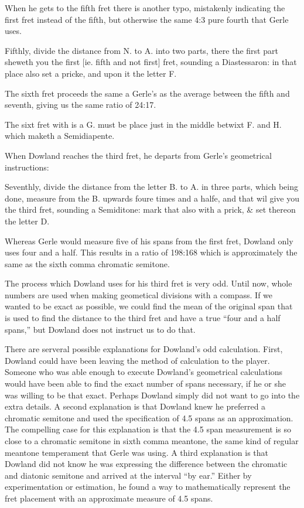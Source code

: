 When he gets to the fifth fret there is another typo, mistakenly indicating the
first fret instead of the fifth, but otherwise the same 4:3 pure fourth that
Gerle uses.
\begin{blocks}
Fifthly, divide the distance from N. to A. into two parts, there the first part
sheweth you the first [ie. fifth and not first] fret, sounding a Diastessaron:
in that place also set a pricke, and upon it the letter F.
\end{blocks}
The sixth fret proceeds the same a Gerle's as the average between the fifth and
seventh, giving us the same ratio of 24:17.
\begin{blocks}
The sixt fret with is a G. must be place just in the middle betwixt F. and H.
which maketh a Semidiapente.
\end{blocks}

When Dowland reaches the third fret, he departs from Gerle's
geometrical instructions:
\begin{blocks}
Seventhly, divide the distance from the letter B. to A. in three parts, which
being done, measure from the B. upwards foure times and a halfe, and that wil
give you the third fret, sounding a Semiditone: mark that also with a prick,
\& set thereon the letter D.
\end{blocks}
Whereas Gerle would measure five of his spans from the first fret, Dowland only
uses four and a half. This results in a ratio of 198:168 which is approximately
the same as the sixth comma chromatic semitone.



The process which Dowland uses for his third fret is very odd.
Until now, whole numbers are used when making geometical divisions with a compass.
If we wanted to be exact as possible, we could find the
mean of the original span that is used to find the distance to the
third fret and have a true “four and a half spans,” but Dowland does not instruct
us to do that.

There are serveral possible explanations for Dowland's odd calculation.  First, Dowland could have
been leaving the
method of calculation to the player.  Someone who was able enough
to execute Dowland's geometrical calculations would have been able to find
the exact number of spans necessary, if he or she was willing to be that exact.  Perhaps
Dowland simply did not want to go into the extra details.
A second explanation is that Dowland knew he preferred a chromatic semitone and used the specification of 4.5 spans as an
approximation.  The compelling case for this explanation is that the 4.5 span
measurement is so close to a chromatic semitone in sixth comma meantone, the
same kind of regular meantone temperament that Gerle was using. A third explanation
is that Dowland did not know he was expressing the difference between the chromatic and diatonic
semitone and arrived at the interval ``by ear.''  Either by experimentation or estimation, he found a way to mathematically
represent the fret placement with an approximate measure of
4.5 spans.


